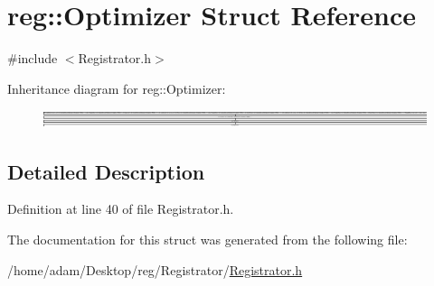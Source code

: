 \hypertarget{structreg_1_1_optimizer}{}\section{reg\+:\+:Optimizer Struct Reference}
\label{structreg_1_1_optimizer}


{\ttfamily \#include $<$Registrator.\+h$>$}

Inheritance diagram for reg\+:\+:Optimizer\+:\begin{figure}[H]
\begin{center}
\leavevmode
\includegraphics[height=0.509207cm]{structreg_1_1_optimizer}
\end{center}
\end{figure}


\subsection{Detailed Description}


Definition at line 40 of file Registrator.\+h.



The documentation for this struct was generated from the following file\+:\begin{DoxyCompactItemize}
\item 
/home/adam/\+Desktop/reg/\+Registrator/\hyperlink{_registrator_8h}{Registrator.\+h}\end{DoxyCompactItemize}
